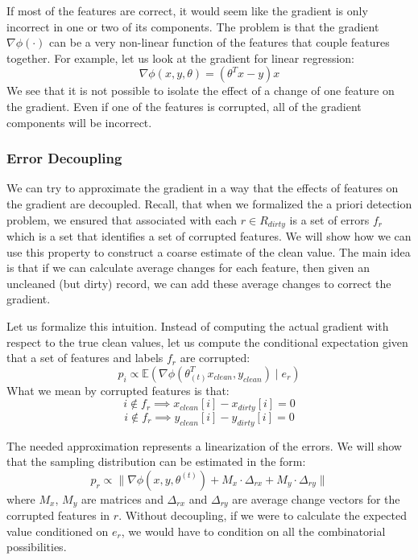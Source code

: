 If most of the features are correct, it would seem like the gradient is only
incorrect in one or two of its components.
The problem is that the gradient $\nabla\phi(\cdot)$ can be a very non-linear function of the features that couple features together.
For example, let us look at the gradient for linear regression:
\[
\nabla\phi(x,y,\theta) = (\theta^Tx - y)x
\]
We see that it is not possible to isolate the effect of a change of one feature on the gradient.
Even if one of the features is corrupted, all of the gradient components will be incorrect.

\subsubsection{Error Decoupling}
We can try to approximate the gradient in a way that the effects of features on the gradient are decoupled.
Recall, that when we formalized the a priori detection problem, we ensured that associated with each $r \in R_{dirty}$ is a set of errors $f_r$ which is a set that identifies a set of corrupted features.
We will show how we can use this property to construct a coarse estimate of the clean value.
The main idea is that if we can calculate average changes for each feature, then given an uncleaned (but dirty) record, we can add these average changes to correct the gradient.

Let us formalize this intuition.
Instead of computing the actual gradient with respect to the 
true clean values, let us compute the conditional expectation given that a set of features and labels $f_r$ are corrupted:
\[
p_i \propto \mathbb{E}(\nabla\phi(\theta_{(t)}^Tx_{clean},y_{clean}) \mid e_r)
\]
What we mean by corrupted features is that:
\[
i \notin f_r \implies x_{clean}[i] - x_{dirty}[i] = 0
\]
\[
i \notin f_r \implies y_{clean}[i] - y_{dirty}[i] = 0
\]

The needed approximation represents a linearization of the errors.
We will show that the sampling distribution can be estimated in the form:
\[
p_{r}\propto\|\nabla\phi(x,y,\theta^{(t)}) + M_x \cdot \Delta_{rx} +  M_y \cdot \Delta_{ry}\|
\]
where $M_x$, $M_y$ are matrices and $\Delta_{rx}$ and $\Delta_{ry}$ are average change vectors for the corrupted features in $r$. 
Without decoupling, if we were to calculate the expected value conditioned on $e_r$, we would have to condition on all the combinatorial possibilities.

